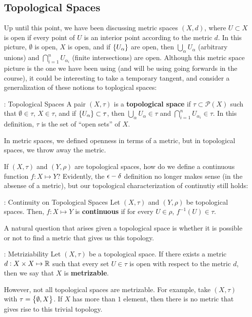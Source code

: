 \subsection{Topological Spaces}
Up until this point, we have been discussing metric spaces $(X, d)$, where $U \subset X$ is open if every point of $U$ is an interior point according to the metric $d$. In this picture, $\emptyset$ is open, $X$ is open, and if $\set{U_\alpha}$ are open, then $\bigcup_{\alpha} U_\alpha$ (arbitrary unions) and $\bigcap_{i=1}^n U_{\alpha_i}$ (finite intersections) are open. Although this metric space picture is the one we have been using (and will be using going forwards in the course), it could be interesting to take a temporary tangent, and consider a generalization of these notions to toplogical spaces:

\begin{ndef}{: Topological Spaces}{}
    A pair $(X, \tau)$ is a \textbf{topological space} if $\tau \subset \mathcal{P}(X)$ such that $\emptyset \in \tau$, $X \in \tau$, and if $\set{U_\alpha} \subset \tau$, then $\bigcup_{\alpha} U_\alpha \in \tau$ and $\bigcap_{i=1}^n U_{\alpha_i} \in \tau$. In this definition, $\tau$ is the set of ``open sets'' of $X$.
\end{ndef}
\noindent In metric spaces, we defined openness in terms of a metric, but in topological spaces, we throw away the metric.

If $(X, \tau)$ and $(Y, \rho)$ are topological spaces, how do we define a continuous function $f: X \mapsto Y$? Evidently, the $\epsilon-\delta$ definition no longer makes sense (in the absense of a metric), but our topological characterization of continutiy still holds:

\begin{ndef}{: Continuity on Topological Spaces}{}
    Let $(X, \tau)$ and $(Y, \rho)$ be topological spaces. Then, $f: X \mapsto Y$ is \textbf{continuous} if for every $U \in \rho$, $f^{-1}(U) \in \tau$. 
\end{ndef}

\noindent A natural question that arises given a topological space is whether it is possible or not to find a metric that gives us this topology. 

\begin{ndef}{: Metriziability}{}
    Let $(X, \tau)$ be a topological space. If there exists a metric $d: X \times X \mapsto \mathbb{R}$ such that every set $U \in \tau$ is open with respect to the metric $d$, then we say that $X$ is \textbf{metrizable}.
\end{ndef}
\noindent However, not all topological spaces are metrizable. For example, take $(X, \tau)$ with $\tau = \set{\emptyset, X}$. If $X$ has more than $1$ element, then there is no metric that gives rise to this trivial topology.

